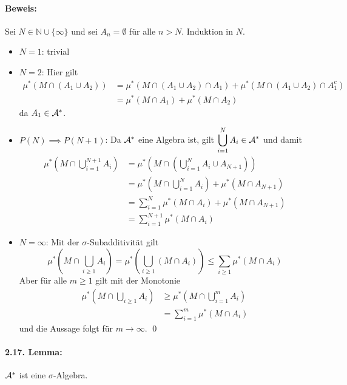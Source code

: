 \paragraph{Beweis:}Sei $N\in\mathbb{N}\cup\{\infty\}$ und sei $A_n=\emptyset$ f\"ur alle $n>N$. Induktion in $N$.
\begin{itemize}
    \item $N=1$: trivial
    \item $N=2$: Hier gilt 
    \begin{align*}
        \mu^*(M\cap(A_1\cup A_2))&=\mu^*(M\cap(A_1\cup A_2)\cap A_1)+\mu^*(M\cap(A_1\cup A_2)\cap A_1^c)\\
        &=\mu^*(M\cap A_1)+\mu^*(M\cap A_2)
    \end{align*}
    da $A_1\in\mathcal{A}^*$.
    \item $P(N)\implies P(N+1)$: Da $\mathcal{A}^*$ eine Algebra ist, gilt $\displaystyle\bigcup_{i=1}^NA_i\in\mathcal{A}^*$ und damit
    \begin{align*}
        \mu^*\left(M\cap\bigcup_{i=1}^{N+1}A_i\right)&=\mu^*\left(M\cap\left(\bigcup_{i=1}^{N}A_i\cup A_{N+1}\right)\right)\\
        &=\mu^*\left(M\cap \bigcup_{i=1}^N A_i\right)+\mu^*(M\cap A_{N+1})\\
        &=\sum_{i=1}^N\mu^*(M\cap A_i)+\mu^*(M\cap A_{N+1})\\
        &=\sum_{i=1}^{N+1}\mu^*(M\cap A_i)
    \end{align*}
    \item $N=\infty$: Mit der $\sigma$-Subadditivit\"at gilt
    $$\mu^*\left(M\cap\bigcup_{i\geq1}A_i\right)=\mu^*\left(\bigcup_{i\geq1}(M\cap A_i)\right)\leq\sum_{i\geq1}\mu^*(M\cap A_i)$$
    Aber f\"ur alle $m\geq1$ gilt mit der Monotonie
    \begin{align*}
        \mu^*\left(M\cap\bigcup_{i\geq1}A_i\right)&\geq\mu^*\left(M\cap\bigcup_{i=1}^mA_i\right)\\
        &=\sum_{i=1}^m\mu^*(M\cap A_i)
    \end{align*}
    und die Aussage folgt f\"ur $m\to\infty$. \qed
\end{itemize}

\paragraph{2.17. Lemma:}$\mathcal{A}^*$ ist eine $\sigma$-Algebra. 

